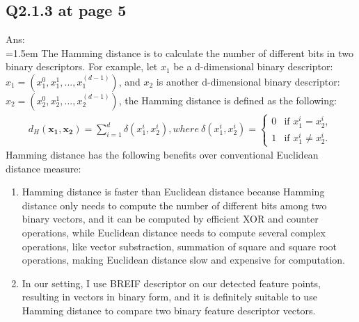 \documentclass{article}
\begin{document}
	\subsection*{Q2.1.3 at page 5}
	Ans:\\
	\hangindent=1.5em \hspace{1.5em} The Hamming distance is to calculate the number of different bits in two binary descriptors. For example, let $x_1$ be a d-dimensional binary descriptor: $x_1 = (x_1^0, x_1^1, ..., x_1^{(d-1)})$, and $x_2$ is another d-dimensional binary descriptor: $x_2 = (x_2^0, x_2^1, ..., x_2^{(d-1)})$, the Hamming distance is defined as the following:
	\begin{eqnarray}
		d_H(\mathbf{x_1}, \mathbf{x_2}) = \sum_{i=1}^{d} \delta(x_1^i, x_2^i), where\ \delta(x_1^i, x_2^i) =
		\begin{cases}
			0 & \text{if } x_1^i = x_2^i, \\
			1 & \text{if } x_1^i \neq x_2^i.
		\end{cases}
	\end{eqnarray}
	Hamming distance has the following benefits over conventional Euclidean distance measure:
	\begin{enumerate}
		\item Hamming distance is faster than Euclidean distance because Hamming distance only needs to compute the number of different bits among two binary vectors, and it can be computed by efficient XOR and counter operations, while Euclidean distance needs to compute several complex operations, like vector substraction, summation of square and square root operations, making Euclidean distance slow and expensive for computation.
		\item In our setting, I use BREIF descriptor on our detected feature points, resulting in vectors in binary form, and it is definitely suitable to use Hamming distance to compare two binary feature descriptor vectors. 
	\end{enumerate}
	
	\newpage
\end{document}
